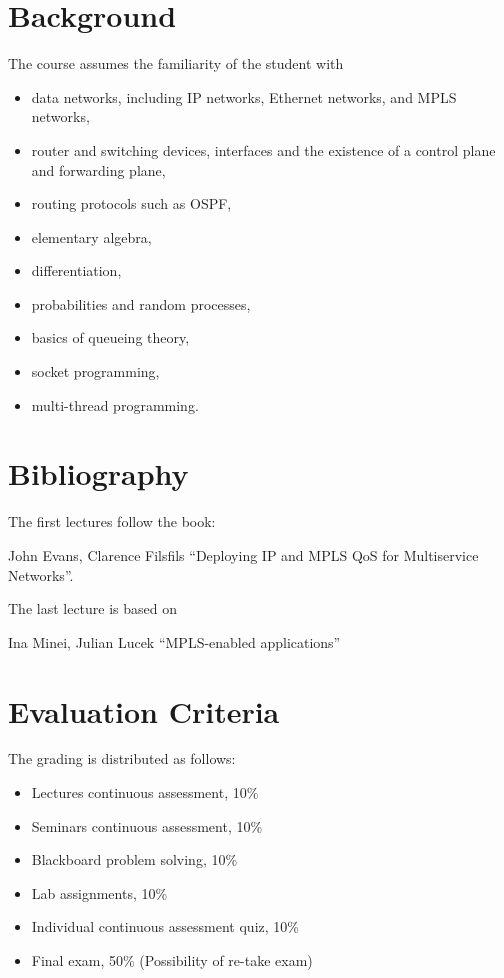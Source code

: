 \section{Background}
The course assumes the familiarity of the student with 
\begin{itemize}
\item data networks, including IP networks, Ethernet networks,  and MPLS networks,
\item router and switching devices, interfaces and the existence of a control plane and forwarding plane,
\item routing protocols such as OSPF,
\item elementary algebra,
\item differentiation,
\item probabilities and random processes, 
\item basics of queueing theory,
\item socket programming,
\item multi-thread programming.
\end{itemize}


\section{Bibliography}

The first lectures follow the book:

John Evans, Clarence Filsfils ``Deploying IP and MPLS QoS for Multiservice Networks''.

The last lecture is based on 

Ina Minei, Julian Lucek ``MPLS-enabled applications''

\section{Evaluation Criteria}

The grading is distributed as follows:
\begin{itemize}
\item Lectures continuous assessment, 10\%
\item Seminars continuous assessment, 10\%
\item Blackboard problem solving, 10\%
\item Lab assignments, 10\%
\item Individual continuous assessment quiz, 10\%
\item Final exam, 50\% (Possibility of re-take exam)
\end{itemize}

